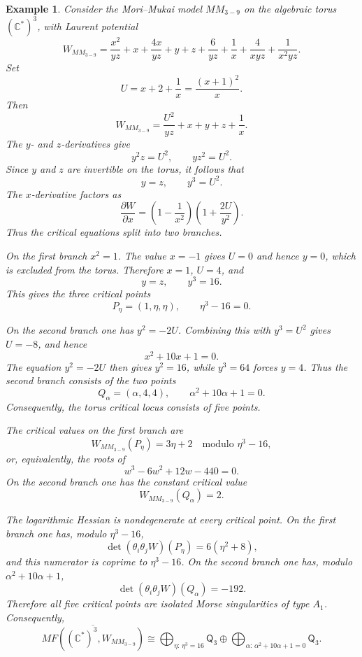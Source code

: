 \documentclass[11pt]{amsart}
\newtheorem{example}{Example}[section]
\newcommand{\MorseCat}[1]{\mathsf{Q}_{#1}}
\begin{document}
\begin{example}
Consider the Mori--Mukai model $MM_{3-9}$ on the algebraic torus
$(\mathbb{C}^*)^3$, with Laurent potential
\[
W_{MM_{3-9}}=\frac{x^2}{yz}+x+\frac{4x}{yz}+y+z
+\frac{6}{yz}+\frac{1}{x}+\frac{4}{xyz}+\frac{1}{x^2yz}.
\]
Set
\[
U=x+2+\frac{1}{x}=\frac{(x+1)^2}{x}.
\]
Then
\[
W_{MM_{3-9}}=\frac{U^2}{yz}+x+y+z+\frac{1}{x}.
\]
The $y$- and $z$-derivatives give
\[
y^2z=U^2,
\qquad
yz^2=U^2.
\]
Since $y$ and $z$ are invertible on the torus, it follows that
\[
y=z,
\qquad
y^3=U^2.
\]
The $x$-derivative factors as
\[
\frac{\partial W}{\partial x}
=\left(1-\frac{1}{x^2}\right)
\left(1+\frac{2U}{y^2}\right).
\]
Thus the critical equations split into two branches.

On the first branch $x^2=1$. The value $x=-1$ gives $U=0$ and hence
$y=0$, which is excluded from the torus. Therefore $x=1$, $U=4$, and
\[
y=z,
\qquad
y^3=16.
\]
This gives the three critical points
\[
P_\eta=(1,\eta,\eta),
\qquad
\eta^3-16=0.
\]

On the second branch one has $y^2=-2U$. Combining this with $y^3=U^2$ gives
$U=-8$, and hence
\[
x^2+10x+1=0.
\]
The equation $y^2=-2U$ then gives $y^2=16$, while $y^3=64$ forces $y=4$.
Thus the second branch consists of the two points
\[
Q_\alpha=(\alpha,4,4),
\qquad
\alpha^2+10\alpha+1=0.
\]
Consequently, the torus critical locus consists of five points.

The critical values on the first branch are
\[
W_{MM_{3-9}}(P_\eta)=3\eta+2
\quad\text{modulo }\eta^3-16,
\]
or, equivalently, the roots of
\[
w^3-6w^2+12w-440=0.
\]
On the second branch one has the constant critical value
\[
W_{MM_{3-9}}(Q_\alpha)=2.
\]

The logarithmic Hessian is nondegenerate at every critical point. On the first
branch one has, modulo $\eta^3-16$,
\[
\det(\theta_i\theta_jW)(P_\eta)=6(\eta^2+8),
\]
and this numerator is coprime to $\eta^3-16$. On the second branch one has,
modulo $\alpha^2+10\alpha+1$,
\[
\det(\theta_i\theta_jW)(Q_\alpha)=-192.
\]
Therefore all five critical points are isolated Morse singularities of type
$A_1$. Consequently,
\[
\overline{MF((\mathbb{C}^*)^3,W_{MM_{3-9}})}
\cong \bigoplus_{\eta:\,\eta^3=16}\MorseCat{3} \oplus \bigoplus_{\alpha:\,\alpha^2+10\alpha+1=0}\MorseCat{3}.
\]
\end{example}
\end{document}
